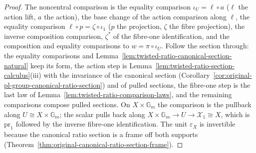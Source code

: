 \begin{proof}
The noncentral comparison is the equality comparison $\iota_U=\ell\circ a$
($\ell$ the action lift, $a$ the action), the base change of the action
comparison along $\ell$, the equality comparison $\ell\circ p=\zeta\circ
\iota_1$ ($p$ the projection, $\zeta$ the fibre projection), the inverse
composition comparison, $\zeta^*$ of the fibre-one identification, and the
composition and equality comparisons to $w=\pi\circ\iota_U$.  Follow the
section through: the equality comparisons and
Lemma~\ref{lem:twisted-ratio-canonical-section-natural} keep its form, the
action step is Lemma~\ref{lem:twisted-ratio-section-calculus}(iii) with the
invariance of the canonical section
(Corollary~\ref{cor:original-pl-group-canonical-ratio-section}) and of pulled
sections, the fibre-one step is the last law of
Lemma~\ref{lem:twisted-ratio-comparison-laws}, and the remaining comparisons
compose pulled sections.  On $X\times\mathbb G_m$ the comparison is the
pullback along $U\cong X\times\mathbb G_m$; the scalar pulls back along
$X\times\mathbb G_m\to U\to\mathcal X_1\cong X$, which is $\mathrm{pr}_1$
followed by the inverse fibre-one identification.  The unit $\varepsilon_X$
is invertible because the canonical ratio section is a frame off both
supports (Theorem~\ref{thm:original-canonical-ratio-section-frame}).
\end{proof}

